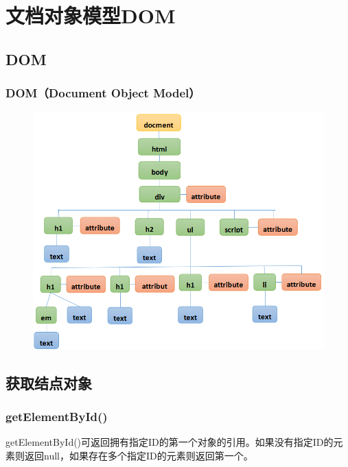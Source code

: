 \newpage

\chapter{文档对象模型DOM}

\section{DOM}

\subsection{DOM（Document Object Model）}

\begin{figure}[H]
	\centering
	\includegraphics[scale=0.8]{img/C17/17-1/1.png}
\end{figure}

\newpage

\section{获取结点对象}

\subsection{getElementById()}

getElementById()可返回拥有指定ID的第一个对象的引用。如果没有指定ID的元素则返回null，如果存在多个指定ID的元素则返回第一个。\\

